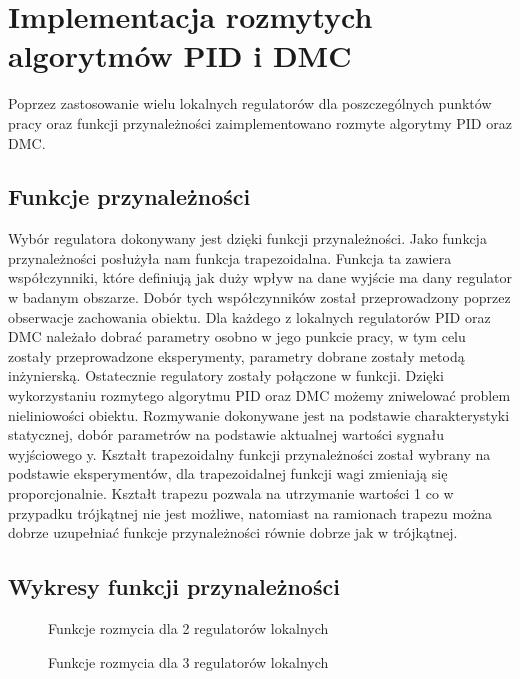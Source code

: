 \section{Implementacja rozmytych algorytmów PID i DMC}
\label{projekt:zad5}

Poprzez zastosowanie wielu lokalnych regulatorów dla poszczególnych punktów
pracy oraz funkcji przynależności zaimplementowano rozmyte algorytmy PID oraz DMC.

\label{projekt:zad5:fuzzyFunctions}
\subsection{Funkcje przynależności}

Wybór regulatora dokonywany jest dzięki funkcji przynależności. 
Jako funkcja przynależności posłużyła nam funkcja trapezoidalna. 
Funkcja ta zawiera współczynniki, które
definiują jak duży wpływ na dane wyjście ma dany regulator w badanym
obszarze. Dobór tych współczynników został przeprowadzony poprzez
obserwacje zachowania obiektu. Dla każdego z lokalnych regulatorów PID oraz
DMC należało dobrać parametry osobno w jego punkcie pracy, w tym celu zostały
przeprowadzone eksperymenty, parametry dobrane zostały metodą inżynierską.
Ostatecznie regulatory zostały połączone w funkcji. Dzięki wykorzystaniu
rozmytego algorytmu PID oraz DMC możemy zniwelować problem nieliniowości
obiektu. Rozmywanie dokonywane jest na podstawie charakterystyki statycznej,
dobór parametrów na podstawie aktualnej wartości sygnału wyjściowego y.
Kształt trapezoidalny funkcji przynależności został wybrany na podstawie
eksperymentów, dla trapezoidalnej funkcji wagi zmieniają się proporcjonalnie.
Kształt trapezu pozwala na utrzymanie wartości 1 co w przypadku trójkątnej nie
jest możliwe, natomiast na ramionach trapezu można dobrze uzupełniać funkcje
przynależności równie dobrze jak w trójkątnej.

\newpage
\subsection{Wykresy funkcji przynależności}

\begin{figure}[H] 
    \centering
    
    \caption{Funkcje rozmycia dla 2 regulatorów lokalnych}
    \label{lab:zad4:fuzzyFunction:2:figure}
\end{figure}

\begin{figure}[H] 
    \centering
    
    \caption{Funkcje rozmycia dla 3 regulatorów lokalnych}
    \label{lab:zad4:fuzzyFunction:3:figure}
\end{figure}

